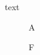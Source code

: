\documentclass{article}
\begin{document}
text
\begin{figure} A \caption{F}\end{figure}
\end{document}
